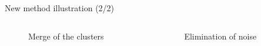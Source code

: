 \begin{frame}{New method illustration (2/2)}
    \begin{columns}
        \begin{column}{0.4\paperwidth}
            \begin{figure}
                \caption{Merge of the clusters}
            \end{figure}
        \end{column}
        \begin{column}{0.4\paperwidth}
            \begin{figure}
                \caption{Elimination of noise}
            \end{figure}
        \end{column}
    \end{columns}
\end{frame}

